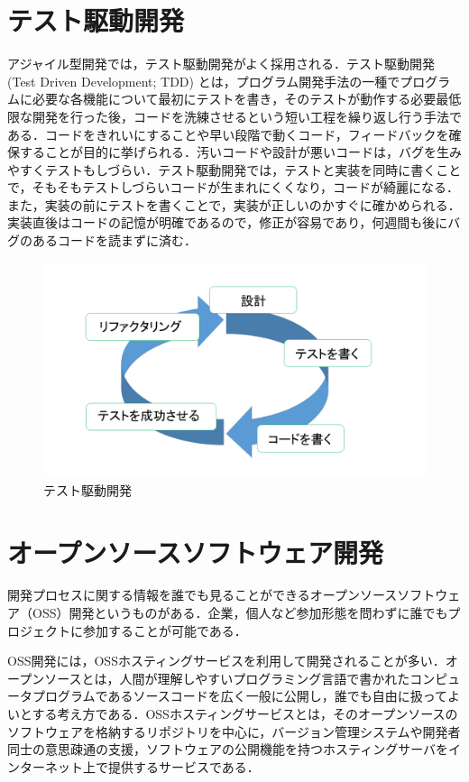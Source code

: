 \newpage

\section{テスト駆動開発}
アジャイル型開発では，テスト駆動開発がよく採用される．テスト駆動開発 (Test Driven Development; TDD) とは，プログラム開発手法の一種でプログラムに必要な各機能について最初にテストを書き，そのテストが動作する必要最低限な開発を行った後，コードを洗練させるという短い工程を繰り返し行う手法である．コードをきれいにすることや早い段階で動くコード，フィードバックを確保することが目的に挙げられる．汚いコードや設計が悪いコードは，バグを生みやすくテストもしづらい．テスト駆動開発では，テストと実装を同時に書くことで，そもそもテストしづらいコードが生まれにくくなり，コードが綺麗になる．また，実装の前にテストを書くことで，実装が正しいのかすぐに確かめられる．実装直後はコードの記憶が明確であるので，修正が容易であり，何週間も後にバグのあるコードを読まずに済む\cite{shimizu2012}．

\begin{figure}[htb]
\centering
\includegraphics[width=13cm]{tdd.png}
\caption{テスト駆動開発}
\end{figure}

\newpage

\section{オープンソースソフトウェア開発}
開発プロセスに関する情報を誰でも見ることができるオープンソースソフトウェア（OSS）開発というものがある．企業，個人など参加形態を問わずに誰でもプロジェクトに参加することが可能である．

OSS開発には，OSSホスティングサービスを利用して開発されることが多い．オープンソースとは，人間が理解しやすいプログラミング言語で書かれたコンピュータプログラムであるソースコードを広く一般に公開し，誰でも自由に扱ってよいとする考え方である．OSSホスティングサービスとは，そのオープンソースのソフトウェアを格納するリポジトリを中心に，バージョン管理システムや開発者同士の意思疎通の支援，ソフトウェアの公開機能を持つホスティングサーバをインターネット上で提供するサービスである\cite{oss}．

